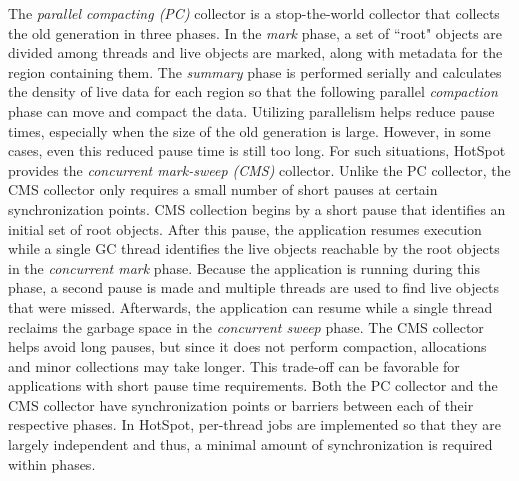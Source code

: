 \documentclass{sig-alternate}
\begin{document}
The \textit{parallel compacting (PC)} collector is a stop-the-world collector that collects the old generation in three phases. In the \textit{mark} phase, a set of ``root" objects are divided among threads and live objects are marked, along with metadata for the region containing them. The \textit{summary} phase is performed serially and calculates the density of live data for each region so that the following parallel \textit{compaction} phase can move and compact the data. Utilizing parallelism helps reduce pause times, especially when the size of the old generation is large. However, in some cases, even this reduced pause time is still too long. For such situations, HotSpot provides the \textit{concurrent mark-sweep (CMS)} collector. Unlike the PC collector, the CMS collector only requires a small number of short pauses at certain synchronization points. CMS collection begins by a short pause that identifies an initial set of root objects. After this pause, the application resumes execution while a single GC thread identifies the live objects reachable by the root objects in the \textit{concurrent mark} phase. Because the application is running during this phase, a second pause is made and multiple threads are used to find live objects that were missed. Afterwards, the application can resume while a single thread reclaims the garbage space in the \textit{concurrent sweep} phase. The CMS collector helps avoid long pauses, but since it does not perform compaction, allocations and minor collections may take longer. This trade-off can be favorable for applications with short pause time requirements. Both the PC collector and the CMS collector have synchronization points or barriers between each of their respective phases. In HotSpot, per-thread jobs are implemented so that they are largely independent and thus, a minimal amount of synchronization is required within phases.
\end{document}
